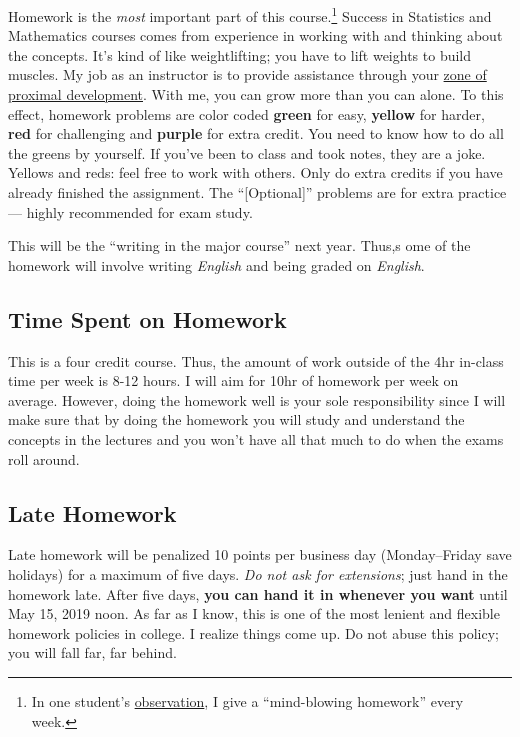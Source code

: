 \documentclass[12pt]{article}
\newcommand{\ingreen}[1]{\color{green}\textbf{#1} \color{black}}
\newcommand{\inyellow}[1]{\color{yellow}\textbf{#1} \color{black}}
\newcommand{\inred}[1]{\color{red}\textbf{#1} \color{black}}
\newcommand{\inpurple}[1]{\color{purple}\textbf{#1} \color{black}}
\newcommand{\qu}[1]{``#1''}
\begin{document}
Homework is the \textit{most} important part of this course.\footnote{In one student's \href{http://www.ratemyprofessors.com/ShowRatings.jsp?tid=1951051}{observation}, I give a \qu{mind-blowing homework} every week.} Success in Statistics and Mathematics courses comes from experience in working with and thinking about the concepts. It's kind of like weightlifting; you have to lift weights to build muscles. My job as an instructor is to provide assistance through your \href{http://en.wikipedia.org/wiki/Zone_of_proximal_development}{zone of proximal development}. With me, you can grow more than you can alone. To this effect, homework problems are color coded \ingreen{green} for easy, \inyellow{yellow} for harder, \inred{red} for challenging and \inpurple{purple} for extra credit. You need to know how to do all the greens by yourself. If you've been to class and took notes, they are a joke. Yellows and reds: feel free to work with others. Only do extra credits if you have already finished the assignment. The \qu{[Optional]} problems are for extra practice --- highly recommended for exam study.

This will be the \qu{writing in the major course} next year. Thus,s ome of the homework will involve writing \textit{English} and being graded on \textit{English}.

\subsection*{Time Spent on Homework }

This is a four credit course. Thus, the amount of work outside of the 4hr in-class time per week is 8-12 hours. I will aim for 10hr of homework per week on average. However, doing the homework well is your sole responsibility since I will make sure that by doing the homework you will study and understand the concepts in the lectures and you won't have all that much to do when the exams roll around.

\subsection*{Late Homework}

Late homework will be penalized 10 points per business day (Monday--Friday save holidays) for a maximum of five days. \textit{Do not ask for extensions}; just hand in the homework late. After five days, \textbf{you can hand it in whenever you want} until May 15, 2019 noon. As far as I know, this is one of the most lenient and flexible homework policies in college. I realize things come up. Do not abuse this policy; you will fall far, far behind.
\end{document}
